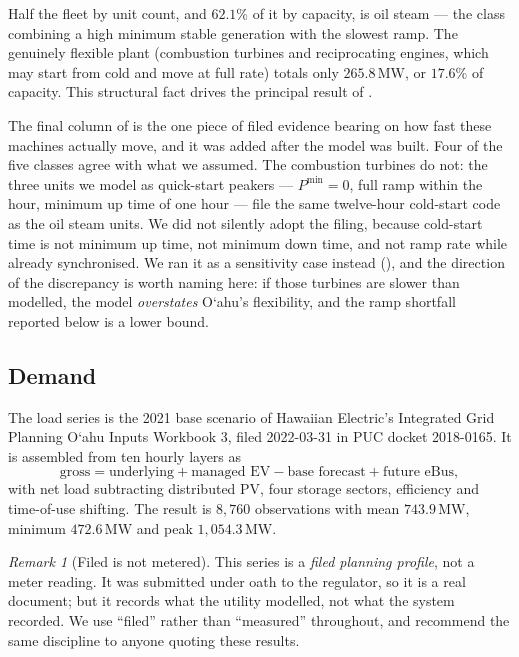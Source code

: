 \documentclass[11pt,a4paper]{article}
\theoremstyle{definition}
\theoremstyle{plain}
\theoremstyle{remark}
\newtheorem{remark}[definition]{Remark}
\newcommand{\MW}{\,\mathrm{MW}}
\newcommand{\okina}{\textquoteleft}
\newcommand{\Oahu}{O\okina ahu}
\begin{document}
Half the fleet by unit count, and $62.1\%$ of it by capacity, is oil steam ---
the class combining a high minimum stable generation with the slowest ramp. The
genuinely flexible plant (combustion turbines and reciprocating engines, which
may start from cold and move at full rate) totals only $265.8\MW$, or $17.6\%$
of capacity. This structural fact drives the principal result of
.

The final column of  is the one piece of filed evidence bearing
on how fast these machines actually move, and it was added after the model was
built. Four of the five classes agree with what we assumed. The combustion
turbines do not: the three units we model as quick-start peakers ---
$P^{\min}=0$, full ramp within the hour, minimum up time of one hour --- file
the same twelve-hour cold-start code as the oil steam units. We did not silently
adopt the filing, because cold-start time is not minimum up time, not minimum
down time, and not ramp rate while already synchronised. We ran it as a
sensitivity case instead (), and the direction of the
discrepancy is worth naming here: if those turbines are slower than modelled,
the model \emph{overstates} \Oahu{}'s flexibility, and the ramp shortfall
reported below is a lower bound.

\subsection{Demand}

The load series is the 2021 base scenario of Hawaiian Electric's Integrated
Grid Planning \Oahu{} Inputs Workbook 3, filed 2022-03-31 in PUC docket
2018-0165. It is assembled from ten hourly layers as
\[
  \text{gross} = \text{underlying} + \text{managed EV} - \text{base forecast}
                 + \text{future eBus},
\]
with net load subtracting distributed PV, four storage sectors, efficiency and
time-of-use shifting. The result is $8{,}760$ observations with mean
$743.9\MW$, minimum $472.6\MW$ and peak $1{,}054.3\MW$.

\begin{remark}[Filed is not metered]
\label{rem:filed}
This series is a \emph{filed planning profile}, not a meter reading. It was
submitted under oath to the regulator, so it is a real document; but it
records what the utility modelled, not what the system recorded. We use
``filed'' rather than ``measured'' throughout, and recommend the same
discipline to anyone quoting these results.
\end{remark}
\end{document}
